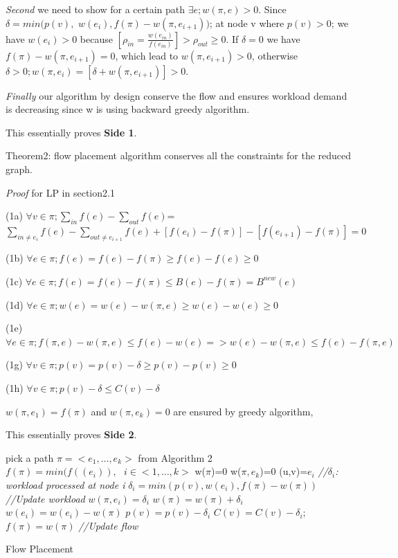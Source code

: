 \documentclass[twocolumn]{article}
\begin{document}
\textit{Second} we need to show for a certain path $\exists e; w(\pi, e)>0$. Since $\delta = min( p(v),$ $w(e_{i}),f(\pi) -w(\pi,e_{i+1}))$; at node v where $p(v)>0$; we have $w(e_i)>0$ because $[\rho_{in} =\frac{ w(e_{in})}{f(e_{in})} ]>\rho_{out}\geq 0$. If $\delta=0$ we have $ f(\pi) -w(\pi,e_{i+1}) =0$, which lead to $ w(\pi, e_{i+1})>0$, otherwise $ \delta>0;w(\pi, e_i) = [ \delta+w(\pi, e_{i+1} )]>0$.

\textit{Finally} our algorithm by design conserve the flow and ensures workload demand is decreasing since w is using backward greedy algorithm.

This essentially proves \textbf{Side 1}.

Theorem2: flow placement algorithm conserves all the constraints for the reduced graph.

\textit{Proof} for LP in section2.1 \newline

(1a)
$\forall v \in \pi; \sum\limits_{in}  f(e) - \sum\limits_{out} f(e)$=
$\sum\limits_{in \not=e_i}  f(e) - \sum\limits_{out\not=e_{i+1} } f(e) +[f(e_i)-f(\pi) ] - [f(e_{i+1}) -f(\pi)] = 0 $

(1b)
$ \forall e \in \pi; f(e) = f(e)-f(\pi) \geq f(e)-f(e) \geq 0$

(1c)
$\forall e \in \pi; f(e) = f(e)-f(\pi) \leq B(e)-f(\pi)=B^{new}(e)$

(1d)
$\forall e \in \pi; w(e) = w(e) - w(\pi, e) \geq w(e) -w(e) \geq 0$

(1e)
$\forall e \in\pi; f(\pi, e)-w(\pi, e) \leq f(e) -w(e) =>w(e) -w(\pi, e) \leq f(e) -f(\pi, e) $

(1g)
$\forall v \in \pi; p(v) = p(v) -\delta \geq p(v) -p(v) \geq 0 $

(1h)
$\forall v \in \pi; p(v) - \delta \leq C(v) - \delta $

$w(\pi, e_1) = f(\pi) $ and $w(\pi, e_k)=0$ are ensured by greedy algorithm, 

This essentially proves \textbf{Side 2}.


\begin{algorithm}\label {Flow Placement}
\SetAlgoLined
\BlankLine
{}
{

pick a path $\pi = <e_1, \dots, e_k> $ from Algorithm 2\;
 	$f(\pi) = min( f((e_i) ), \text{ } i\in <1,\dots,k>$\;
	\BlankLine
	w($\pi$)=0\;
	w($\pi, e_k$)=0\;
	\BlankLine
	{
	(u,v)=$e_i$\;
	\emph{//$\delta_i$: workload processed at node i}\;
	$\delta_i = min( p(v), w(e_{i}) , f(\pi) -w(\pi))$\;
	\emph{//Update workload}\;
	$w(\pi, e_i) =\delta_i$\;
	$ w(\pi)= w(\pi)+ \delta_i$\;
	$w(e_i) = w(e_i)- w(\pi)$\;
	$p(v) = p(v)-\delta_i$\;
	$C(v) = C(v) - \delta_i$;
	}
	\BlankLine
	$f(\pi) = w(\pi) $
	\BlankLine
	\emph{//Update flow}\;
	
}
\caption{Flow Placement}
\end{algorithm}
\end{document}
